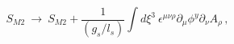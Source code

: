 \begin{equation}
S_{M2}~\longrightarrow~S_{M2}+\displaystyle{\frac{1}{{(g_s/l_s)}}}\displaystyle{\int d\xi^{3}}~
\epsilon^{\mu\nu\rho}\partial_{\mu}\phi^{y}\partial_{\nu}A_{\rho}\,,\label{Stotal}
\end{equation}

